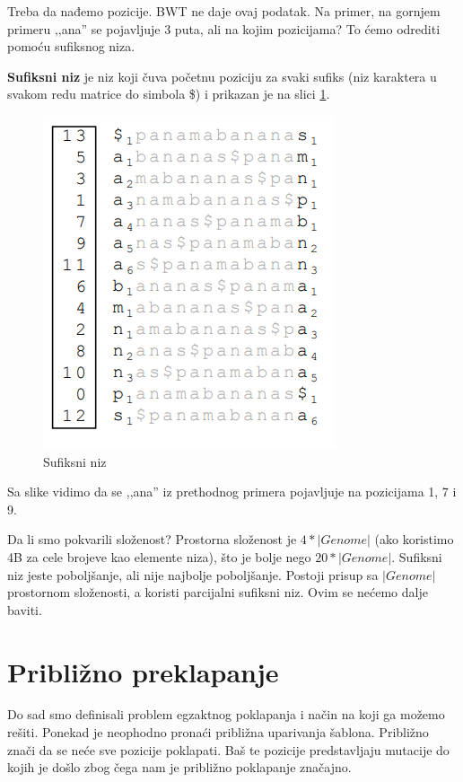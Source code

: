 Treba da nađemo pozicije. BWT ne daje ovaj podatak. Na primer, na gornjem primeru ‚‚ana'' se pojavljuje 3 puta, ali na kojim pozicijama? To ćemo odrediti pomoću sufiksnog niza.

\textbf{Sufiksni niz} je niz koji čuva početnu poziciju za svaki sufiks (niz karaktera u svakom redu matrice do simbola \$) i prikazan je na slici \ref{sufiksniNiz}.


\begin{figure}[h!]
\centering
\includegraphics[scale=0.75]{poglavlja/9/slike/sufiksniNiz.png}
\caption{Sufiksni niz}
\label{sufiksniNiz}
\end{figure}

Sa slike vidimo da se ‚‚ana'' iz prethodnog primera pojavljuje na pozicijama 1, 7 i 9.

Da li smo pokvarili složenost? Prostorna složenost je $4 * |Genome|$ (ako koristimo 4B za cele brojeve kao elemente niza), što je bolje nego $20 * |Genome|$. Sufiksni niz jeste poboljšanje, ali nije najbolje poboljšanje. Postoji prisup sa $|Genome|$ prostornom složenosti, a koristi  parcijalni sufiksni niz. Ovim se nećemo dalje baviti.

\section{Približno preklapanje}

Do sad smo definisali problem egzaktnog poklapanja i način na koji ga možemo rešiti. Ponekad je neophodno pronaći približna uparivanja šablona. Približno znači da se neće sve pozicije poklapati. Baš te pozicije predstavljaju mutacije do kojih je došlo zbog čega nam je približno poklapanje značajno. 


